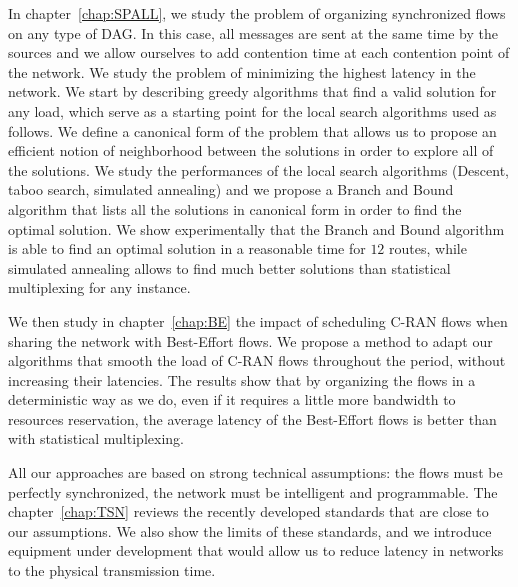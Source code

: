 In chapter~\ref{chap:SPALL}, we study the problem of organizing synchronized flows on any type of DAG. In this case, all messages are sent at the same time by the sources and we allow ourselves to add contention time at each contention point of the network. We study the problem of minimizing the highest latency in the network. We start by describing greedy algorithms that find a valid solution for any load, which serve as a starting point for the local search algorithms used as follows. We define a canonical form of the problem that allows us to propose an efficient notion of neighborhood between the solutions in order to explore all of the solutions. We study the performances of the local search algorithms (Descent, taboo search, simulated annealing) and we propose a Branch and Bound algorithm that lists all the solutions in canonical form in order to find the optimal solution. We show experimentally that the Branch and Bound algorithm is able to find an optimal solution in a reasonable time for $12$ routes, while simulated annealing allows to find much better solutions than statistical multiplexing for any instance.

We then study in chapter~\ref{chap:BE} the impact of scheduling C-RAN flows when sharing the network with Best-Effort flows. We propose a method to adapt our algorithms that smooth the load of C-RAN flows throughout the period, without increasing their latencies. The results show that by organizing the flows in a deterministic way as we do, even if it requires a little more bandwidth to resources reservation, the average latency of the Best-Effort flows is better than with statistical multiplexing.

All our approaches are based on strong technical assumptions: the flows must be perfectly synchronized, the network must be intelligent and programmable. The chapter~\ref{chap:TSN} reviews the recently developed standards that are close to our assumptions. We also show the limits of these standards, and we introduce equipment under development that would allow us to reduce latency in networks to the physical transmission time.

